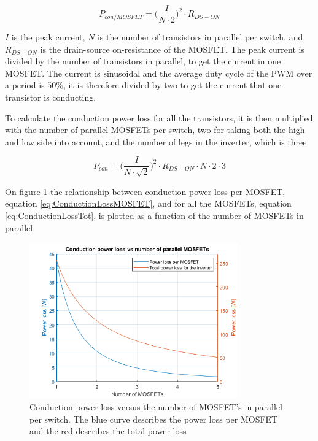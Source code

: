     \begin{equation}
        P_{con/MOSFET} = \bigg( \frac{I}{N \cdot 2} \bigg) ^2 \cdot R_{DS-ON}
        \label{eq:ConductionLossMOSFET}
    \end{equation}

$I$ is the peak current, $N$ is the number of transistors in parallel per switch, and $R_{DS-ON}$ is the drain-source on-resistance of the MOSFET.
The peak current is divided by the number of transistors in parallel, to get the current in one MOSFET. The current is sinusoidal and the average duty cycle of the PWM over a period is $50 \% $, it is therefore divided by two to get the current that one transistor is conducting.

To calculate the conduction power loss for all the transistors, it is then multiplied with the number of parallel MOSFETs per switch, two for taking both the high and low side into account, and the number of legs in the inverter, which is three.

    \begin{equation}
        P_{con} = \bigg( \frac{I}{N \cdot \sqrt{2}} \bigg) ^2 \cdot R_{DS-ON} \cdot N \cdot 2 \cdot 3
        \label{eq:ConductionLossTot}
    \end{equation}

On figure \ref{fig:ConductionLoss} the relationship between conduction power loss per MOSFET, equation \ref{eq:ConductionLossMOSFET}, and for all the MOSFETs, equation \ref{eq:ConductionLossTot}, is plotted as a function of the number of MOSFETs in parallel. 

    \begin{figure}[H]
		\centering
		\includegraphics[width=0.8\textwidth]{pictures/hardware/Power_Board/Conduction_loss.png}
		\caption{Conduction power loss versus the number of MOSFET's in parallel per switch. The blue curve describes the power loss per MOSFET and the red describes the total power loss}
		\label{fig:ConductionLoss}
	\end{figure} 

